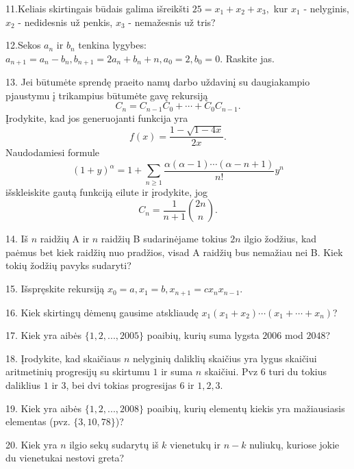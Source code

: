   11.\hspace{0.15cm}Keliais skirtingais būdais galima išreikšti $25 = x_1 + x_2 + x_3,$ kur $x_1$ - nelyginis, $x_2$ - nedidesnis už penkis, $x_3$ - nemažesnis už tris?\smallskip
  
  12.\hspace{0.15cm}Sekos $a_n$ ir $b_n$ tenkina lygybes:
  $a_{n+1}=a_{n} - b_{n},  b_{n+1}=2a_{n} +b_{n}+n,  a_{0}=2, b_{0}=0.$
  Raskite jas.
  \smallskip
  
  13.\hspace{0.15cm} Jei būtumėte sprendę praeito namų darbo uždavinį su daugiakampio pjaustymu į trikampius būtumėte gavę rekursiją $$C_n = C_{n-1}C_{0} + \cdots + C_0C_{n-1}.$$ Įrodykite, kad jos generuojanti funkcija yra $$f(x) = \frac{1-\sqrt{1-4x}}{2x}.$$
  Naudodamiesi formule $$(1+y)^\alpha = 1 + \sum_{n\geq 1}\frac{\alpha(\alpha-1)\cdots(\alpha - n + 1)}{n!}y^n$$ išskleiskite gautą funkciją eilute ir įrodykite, jog $$C_n = \frac{1}{n+1}\binom{2n}{n}.$$\smallskip
  
  14.\hspace{0.15cm} Iš $n$ raidžių A ir $n$ raidžių B sudarinėjame tokius $2n$ ilgio žodžius, kad paėmus bet kiek raidžių nuo pradžios, visad A raidžių bus nemažiau nei B. Kiek tokių žodžių pavyks sudaryti?\smallskip
  
  15.\hspace{0.15cm} Išspręskite rekursiją $x_0 = a, x_1 = b, x_{n+1}=cx_nx_{n-1}.$\smallskip
  
  16.\hspace{0.15cm} Kiek skirtingų dėmenų gausime atskliaudę $x_1(x_1+x_2)\cdots(x_1+\cdots+x_n)$?\smallskip
  
  17.\hspace{0.15cm} Kiek yra aibės $\{1,2,...,2005\}$ poaibių, kurių suma lygsta $2006$ mod $2048$?\smallskip
  
  18.\hspace{0.15cm} Įrodykite, kad skaičiaus $n$ nelyginių daliklių skaičius yra lygus skaičiui aritmetinių progresijų su skirtumu $1$ ir suma $n$ skaičiui. Pvz $6$ turi du tokius daliklius $1$ ir $3$, bei dvi tokias progresijas $6$ ir $1,2,3$.\smallskip
  
  19.\hspace{0.15cm} Kiek yra aibės $\{1,2,...,2008\}$ poaibių, kurių elementų kiekis yra mažiausiasis elementas (pvz. $\{3,10,78\}$)?\smallskip
  
  20.\hspace{0.15cm} Kiek yra $n$ ilgio sekų sudarytų iš $k$ vienetukų ir $n-k$ nuliukų, kuriose jokie du vienetukai nestovi greta? 
  
